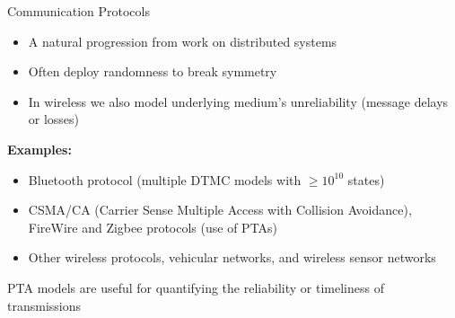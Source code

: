 \documentclass[dvipsnames]{beamer}
\begin{document}
\begin{frame}{Communication Protocols}

    \begin{itemize}
        \item A natural progression from work on distributed systems
        \item Often deploy randomness to break symmetry
        \item In wireless we also model underlying medium's unreliability (message delays or losses)
    \end{itemize}

    \textbf{Examples:}
    \begin{itemize}
        \item Bluetooth protocol (multiple DTMC models with $\geq 10^{10}$ states)
        \item CSMA/CA (Carrier Sense Multiple Access with Collision Avoidance), FireWire and Zigbee protocols (use of PTAs)
        \item Other wireless protocols, vehicular networks, and wireless sensor networks
    \end{itemize}

    PTA models are useful for quantifying the reliability or timeliness of transmissions



\end{frame}

\end{document}
